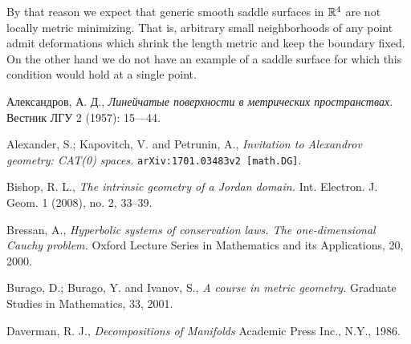 \documentclass{article}
\begin{document}
By that reason we expect that generic smooth saddle surfaces in $\mathbb{R}^4$ are not locally metric minimizing. 
That is, arbitrary small neighborhoods of any point admit deformations which shrink 
the length metric and keep the boundary fixed.
On the other hand we do not have an example of a saddle surface for which this condition would hold at a single point.


\begin{thebibliography}{52}

\begin{otherlanguage}{russian}
Александров, А. Д., 
\textit{Линейчатые поверхности в метрических пространствах.}
Вестник ЛГУ 2 (1957): 15---44.
\end{otherlanguage}

Alexander, S.; Kapovitch, V. and Petrunin, A.,
\textit{Invitation to Alexandrov geometry: CAT(0) spaces.}
\texttt{arXiv:1701.03483v2 [math.DG]}.

Bishop, R. L.,
\textit{The intrinsic geometry of a Jordan domain.}
Int. Electron. J. Geom. 1 (2008), no. 2, 33--39. 

 Bressan, A.,
\textit{Hyperbolic systems of conservation laws.
The one-dimensional Cauchy problem.}
Oxford Lecture Series in Mathematics and its Applications, 20, 2000.

Burago, D.; Burago, Y. and Ivanov, S.,
\textit{A course in metric geometry.}
Graduate Studies in Mathematics, 33, 2001.


 Daverman, R. J.,
\textit{Decompositions of Manifolds}
Academic Press Inc., N.Y., 1986.






\end{thebibliography}
\end{document}
